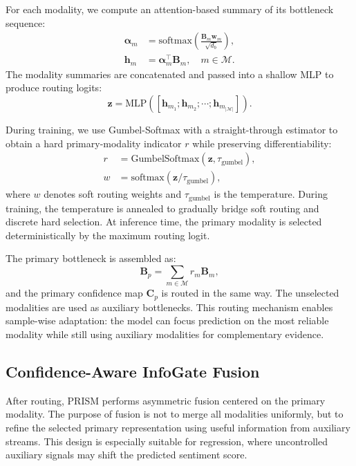 \documentclass[11pt]{article}
\begin{document}
For each modality, we compute an attention-based summary of its bottleneck
sequence:
\begin{align}
\boldsymbol{\alpha}_m
&=
\mathrm{softmax}\!\left(
\frac{\mathbf{B}_m\mathbf{w}_m}{\sqrt{d_b}}
\right),
\\
\mathbf{h}_m
&=
\boldsymbol{\alpha}_m^{\top}\mathbf{B}_m,
\quad m\in\mathcal{M}.
\end{align}
The modality summaries are concatenated and passed into a shallow MLP to
produce routing logits:
\begin{equation}
\mathbf{z} =
\mathrm{MLP}
([\mathbf{h}_{m_1};\mathbf{h}_{m_2};\cdots;\mathbf{h}_{m_{|\mathcal{M}|}}]).
\end{equation}

During training, we use Gumbel-Softmax with a straight-through estimator to
obtain a hard primary-modality indicator $r$ while preserving
differentiability:
\begin{equation}
\begin{aligned}
r &= \mathrm{GumbelSoftmax}(\mathbf{z},\tau_{\mathrm{gumbel}}), \\
w &= \mathrm{softmax}(\mathbf{z}/\tau_{\mathrm{gumbel}}),
\end{aligned}
\end{equation}
where $w$ denotes soft routing weights and $\tau_{\mathrm{gumbel}}$ is the
temperature. During training, the temperature is annealed to gradually bridge
soft routing and discrete hard selection. At inference time, the primary
modality is selected deterministically by the maximum routing logit.

The primary bottleneck is assembled as:
\begin{equation}
\mathbf{B}_p =
\sum_{m\in\mathcal{M}} r_m \mathbf{B}_m,
\end{equation}
and the primary confidence map $\mathbf{C}_p$ is routed in the same way.
The unselected modalities are used as auxiliary bottlenecks. This routing
mechanism enables sample-wise adaptation: the model can focus prediction on
the most reliable modality while still using auxiliary modalities for
complementary evidence.

\subsection{Confidence-Aware InfoGate Fusion}
\label{sec:method-layer}

After routing, PRISM performs asymmetric fusion centered on the primary
modality. The purpose of fusion is not to merge all modalities uniformly, but
to refine the selected primary representation using useful information from
auxiliary streams. This design is especially suitable for regression, where
uncontrolled auxiliary signals may shift the predicted sentiment score.
\end{document}
